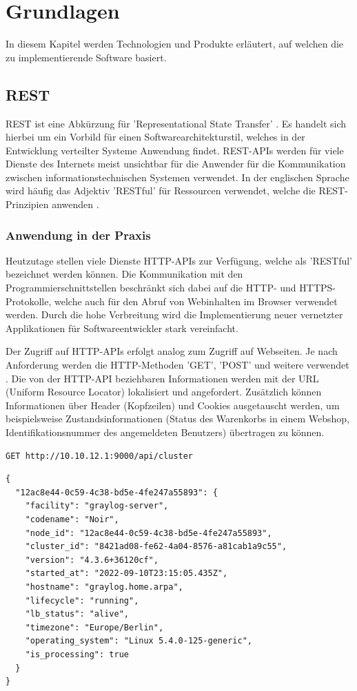 \chapter{Grundlagen}
\label{cha:grundlagen}

In diesem Kapitel werden Technologien und Produkte erläutert, auf welchen die zu implementierende Software basiert.

\section{REST}

REST ist eine Abkürzung für 'Representational State Transfer' \cite[S. 76 ff.]{rest}. Es handelt sich hierbei um ein Vorbild für einen Softwarearchitekturstil, welches in der Entwicklung verteilter Systeme Anwendung findet. REST-APIs werden für viele Dienste des Internets meist unsichtbar für die Anwender für die Kommunikation zwischen informationstechnischen Systemen verwendet. In der englischen Sprache wird häufig das Adjektiv 'RESTful' für Ressourcen verwendet, welche die REST-Prinzipien anwenden \cite[S. 277]{swdev}.

\subsection{Anwendung in der Praxis}

Heutzutage stellen viele Dienste HTTP-APIs zur Verfügung, welche als 'RESTful' bezeichnet werden können. Die Kommunikation mit den Programmierschnittstellen beschränkt sich dabei auf die HTTP- und HTTPS-Protokolle, welche auch für den Abruf von Webinhalten im Browser verwendet werden. Durch die hohe Verbreitung wird die Implementierung neuer vernetzter Applikationen für Softwareentwickler stark vereinfacht.

Der Zugriff auf HTTP-APIs erfolgt analog zum Zugriff auf Webseiten. Je nach Anforderung werden die HTTP-Methoden 'GET', 'POST' und weitere verwendet \cite[S. 279]{swdev}. Die von der HTTP-API beziehbaren Informationen werden mit der URL (Uniform Resource Locator) lokalisiert und angefordert. Zusätzlich können Informationen über Header (Kopfzeilen) und Cookies ausgetauscht werden, um beispielsweise Zustandsinformationen (Status des Warenkorbs in einem Webshop, Identifikationsnummer des angemeldeten Benutzers) übertragen zu können.

\begin{lstlisting}[caption={Beispiel eines Aufrufs der Graylog REST-API.}, label=bsp-rest-api, numbers=none, xleftmargin=6mm]
GET http://10.10.12.1:9000/api/cluster
\end{lstlisting}
\begin{lstlisting}[xleftmargin=6mm]
{
  "12ac8e44-0c59-4c38-bd5e-4fe247a55893": {
    "facility": "graylog-server",
    "codename": "Noir",
    "node_id": "12ac8e44-0c59-4c38-bd5e-4fe247a55893",
    "cluster_id": "8421ad08-fe62-4a04-8576-a81cab1a9c55",
    "version": "4.3.6+36120cf",
    "started_at": "2022-09-10T23:15:05.435Z",
    "hostname": "graylog.home.arpa",
    "lifecycle": "running",
    "lb_status": "alive",
    "timezone": "Europe/Berlin",
    "operating_system": "Linux 5.4.0-125-generic",
    "is_processing": true
  }
}
\end{lstlisting}

